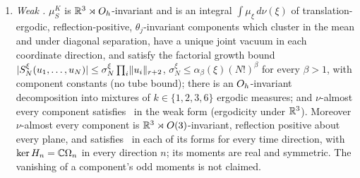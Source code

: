 \begin{theorem}
\begin{enumerate}[label=\textup{(\roman*)},leftmargin=*]
\item \emph{Weak \OSf.} $\mu^K_S$ is $\mathbb R^3\rtimes O_h$-invariant and is an integral $\int\mu_\xi\,d\nu(\xi)$ of translation-ergodic, reflection-positive, $\theta_j$-invariant components which cluster in the mean and under diagonal separation, have a unique joint vacuum in each coordinate direction, and satisfy the factorial growth bound $|S^\xi_N(u_1,\dots,u_N)|\le\sigma^\xi_N\prod_i\lVert u_i\rVert_{r+2}$, $\sigma^\xi_N\le\alpha_\beta(\xi)(N!)^\beta$ for every $\beta>1$, with component constants (no tube bound); there is an $O_h$-invariant decomposition into mixtures of $k\in\{1,2,3,6\}$ ergodic measures; and $\nu$-almost every component satisfies \OSf\ in the weak form (ergodicity under $\mathbb R^3$). Moreover $\nu$-almost every component is $\mathbb R^3\rtimes O(3)$-invariant, reflection positive about every plane, and satisfies \OSf\ in each of its forms for every time direction, with $\ker H_n=\mathbb C\Omega_n$ in every direction $n$; its moments are real and symmetric. The vanishing of a component's odd moments is not claimed.
\end{enumerate}


\end{theorem}
